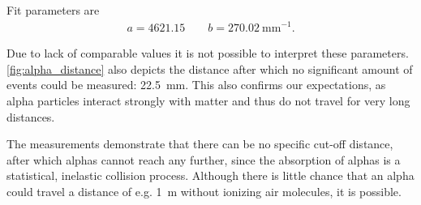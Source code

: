Fit parameters are
\begin{gather*}
	a=4621.15\qquad b=\SI{270.02}{\milli\meter}^{-1}.
\end{gather*}

Due to lack of comparable values it is not possible to interpret these parameters. 
\autoref{fig:alpha_distance} also depicts the distance after which no significant amount of events could be measured: \SI{22.5}{\milli\meter}.
This also confirms our expectations, as alpha particles interact strongly with matter and thus do not travel for very long distances.

The measurements demonstrate that there can be no specific cut-off distance, after which alphas cannot reach any further, since the absorption of alphas is a statistical, inelastic collision process.
Although there is little chance that an alpha could travel a distance of e.g. \SI{1}{\meter} without ionizing air molecules, it is possible.
